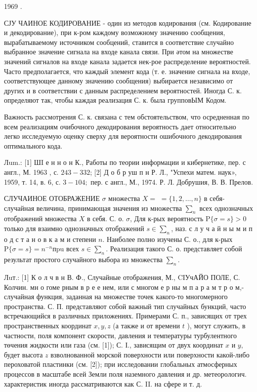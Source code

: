 \documentclass[10pt]{article}
\begin{document}
1969 .



СЈУ ЧАИНОЕ КОДИРОВАНИЕ - один из методов кодирования (см. Кодирование и декодирование), при к-ром каждому возможному значению сообщения, вырабатываемому источником сообцений, ставится в соответствие случайно выбранное значение сигнала на входе канала связи. При әтом на множестве значений сигналов на входе канала задается нек-рое распределение вероятностей. Часто предполагается, что каждый элемент кода (т. е. значение сигнала на входе, соответствующее данному значению сообщения) выбирается независимо от других и в соответствии с данным распределением вероятностей. Иногда С. к. определяют так, чтобы каждая реализация С. к. была групповЫМ Кодом.



Важность рассмотрения С. к. связана с тем обстоятельством, что осредненная по всем реализациям очибочного декодирования вероятность дает относительно легко исследуемую оценку сверху для вероятности ошибочного декодирования оптимального кода.



Лum.: [1] ШI е н н о н К., Работы по теории информации и кибернетике, пер. с англ., М. 1963 , с. $243-332$; [2] Д о б р уш п н Р. Л., "Успехи матем. наук», 1959, т. 14, в. 6, с. $3-104 ;$ пер. с англ., М., 1974. Р. Л. Добрушия, В. В. Прелов.



СЛУЧАИНОЕ ОТОБРАЖЕНИЕ $\sigma$ множества $X=$ $=\{1,2, \ldots, n\}$ в себя-случайная величина, принимающая значения из множества $\sum_{n}$ всех однозначных отображений множества $X$ в себя. С. о. $\sigma$, Для к-рых вероятность $\mathrm{P}\{\sigma=s\}>0$ только для взаимно однозначных отображений $s \in \sum_{n}$, наз. с л у ч а й н ы м и п о д с т а н о в к а м и степени $n$. Наиболее полно изучены С. о., для к-рых $\mathrm{P}\{\sigma=s\}=n^{-n} п \mathrm{pu}$ всех $s \in \sum_{n}$. Реализация такого С. о. представляет собой результат простого случайного выбора из множества $\sum_{n}$.



Лuт.: [1] К о л ч в н В. Ф., Случайные отображения, М., CІУчАЙО ПОЛЕ, С. Колчин. мн о гоме рным в р е е нем, или с многом е р ны м п а р а м т р о м,- случайная функция, заданная на множестве точек какого-то многомерного пространства. С. П. представляют собой важный тип случайных бункций, часто встречающийся в различных приложениях. Примерами С. п., зависящих от трех пространственных координат $x, y, z$ (а также и от времени $t$ ), могут служить, в частности, поля компонент скорости, давления и температуры турбулентного төчения жидкости или газа (см. [1]); С. І., зависящим от двух координат $x$ и $y$, будет высота $z$ взволнованной морской поверхности или поверхности какой-либо пероховатой пластинки (см. [2]); при исследовании глобальных атмосферных процессов в масштабе всей Земли поля наземного давления и др. метеорологич. характеристик иногда рассматриваются как С. II. на сфере и т. д.
\end{document}
